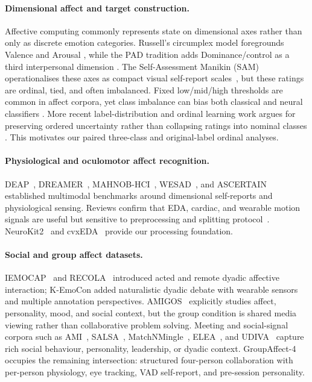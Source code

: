 \documentclass[sigconf,nonacm]{acmart}
\begin{document}
\paragraph{Dimensional affect and target construction.}
Affective computing commonly represents state on dimensional axes rather than
only as discrete emotion categories.
Russell's circumplex model foregrounds Valence and Arousal
\cite{russell1980circumplex}, while the PAD tradition adds
Dominance/control as a third interpersonal dimension
\cite{mehrabian1996pleasure}.
The Self-Assessment Manikin (SAM) operationalises these axes as compact
visual self-report scales~\cite{bradley1994sam}, but these ratings are
ordinal, tied, and often imbalanced.
Fixed low/mid/high thresholds are common in affect corpora, yet class
imbalance can bias both classical and neural classifiers
\cite{he2009imbalanced,johnson2019classimbalance}.  More recent
label-distribution and ordinal learning work argues for preserving ordered
uncertainty rather than collapsing ratings into nominal classes
\cite{geng2016label,wen2023ordinal}.  This motivates our paired
three-class and original-label ordinal analyses.

\paragraph{Physiological and oculomotor affect recognition.}
DEAP~\cite{koelstra2012deap}, DREAMER~\cite{katsigiannis2018dreamer},
MAHNOB-HCI~\cite{soleymani2012mahnob}, WESAD~\cite{schmidt2018wesad}, and
ASCERTAIN~\cite{subramanian2018ascertain} established multimodal benchmarks
around dimensional self-reports and physiological sensing.
Reviews confirm that EDA, cardiac, and wearable motion signals are useful but
sensitive to preprocessing and splitting
protocol~\cite{shu2018review,ahmad2022survey,kreibig2010autonomic}.
NeuroKit2~\cite{makowski2021neurokit2} and cvxEDA~\cite{greco2016cvxeda}
provide our processing foundation.

\paragraph{Social and group affect datasets.}
IEMOCAP~\cite{busso2008iemocap} and RECOLA~\cite{ringeval2013introducing}
introduced acted and remote dyadic affective interaction; K-EmoCon
\cite{park2020kemocon} added naturalistic dyadic debate with wearable sensors
and multiple annotation perspectives.  AMIGOS~\cite{mirandacorrea2021amigos}
explicitly studies affect, personality, mood, and social context, but the
group condition is shared media viewing rather than collaborative problem
solving.  Meeting and social-signal corpora such as AMI~\cite{mccowan2005ami},
SALSA~\cite{alameda2015salsa}, MatchNMingle~\cite{cabrera2018matchnmingle},
ELEA~\cite{sanchez2012emergent}, and UDIVA~\cite{palmero2021context}
capture rich social behaviour, personality, leadership, or dyadic context.
GroupAffect-4~\cite{groupaffect4} occupies the remaining intersection:
structured four-person collaboration with per-person physiology, eye tracking,
VAD self-report, and pre-session personality.
\end{document}
